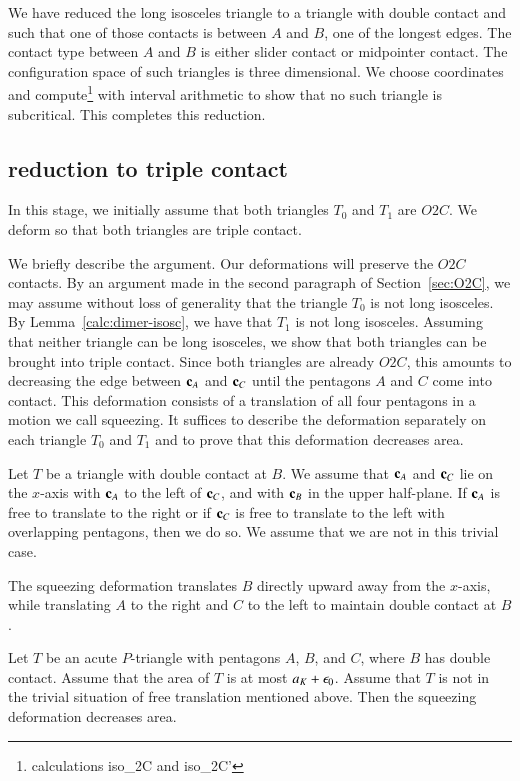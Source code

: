 We have reduced the long isosceles triangle to a triangle with double contact and such that one of those contacts is between $A$ and $B$, one of the
longest edges.  The contact type between $A$ and $B$ is either slider contact or midpointer contact.  The configuration space of such triangles is
three dimensional.  We choose coordinates and compute\footnote{calculations iso\_2C and iso\_2C'} 
with interval arithmetic to show that no such triangle is subcritical.  This completes this reduction.

\subsection{reduction to triple contact}

In this stage, we initially assume that both triangles $T_0$ and $T_1$ are $O2C$.
We deform so that both triangles are triple contact.

We briefly describe the argument.   Our deformations will preserve the $O2C$ contacts.  By an argument made in the second paragraph of Section~\ref{sec:O2C},
we may assume without loss of generality that the triangle $T_0$ is not long isosceles.   By Lemma~\ref{calc:dimer-isosc}, we have that $T_1$ is not long
isosceles.
Assuming that neither triangle can be long isosceles,
 we show that both triangles can be brought into triple contact.  Since both triangles are already $O2C$, this amounts
to decreasing the edge between ${\mathbf c}_A$ and ${\mathbf c}_C$ until the pentagons $A$ and $C$ come into contact.
This deformation consists of a translation of all four pentagons in a motion we call squeezing.  It suffices to describe the deformation separately on
each triangle $T_0$ and $T_1$ and to prove that this deformation decreases area.  

Let $T$ be a triangle with double contact at $B$.  We assume that ${\mathbf c}_A$ and ${\mathbf c}_C$ lie on the $x$-axis with ${\mathbf c}_A$ to the left of ${\mathbf c}_C$, and
with ${\mathbf c}_B$ in the upper half-plane.
If ${\mathbf c}_A$ is free to translate to the right or if ${\mathbf c}_C$ is free to translate to the left with overlapping pentagons, then we do so.  We assume that
we are not in this trivial case.

The squeezing deformation translates $B$ directly upward away from the $x$-axis, while translating $A$ to the right and $C$ to the left to maintain
double contact at $B$.  

\begin{lemma}  Let $T$ be an acute $P$-triangle with pentagons $A$, $B$, and $C$, where $B$ has double contact.
Assume that the  area of $T$ is at most $a_K+\epsilon_0$.  Assume that $T$ is not in the trivial situation of free translation mentioned above.
Then the squeezing deformation decreases area.
\end{lemma}

